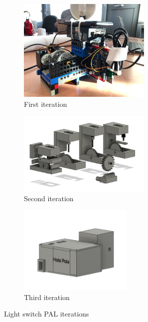 \documentclass[onecolumn]{IEEEtran}
\begin{document}
          \begin{figure}
            \begin{subfigure}{.3\textwidth}
                \centering
                \includegraphics[width=0.7\textwidth]{images/Light1.png}
                \caption{First iteration}
            \end{subfigure}\hfill
            \begin{subfigure}{.3\textwidth}
                \centering
                \includegraphics[width=0.7\textwidth]{images/Light2.png}
                \caption{Second iteration}
            \end{subfigure}\hfill
            \begin{subfigure}{.3\textwidth}
                \centering
                \includegraphics[width=0.6\textwidth]{images/Light3.png}
                \caption{Third iteration}
            \end{subfigure}
        \caption{Light switch PAL iterations}
        \label{fig:switchPALs}
        \end{figure}
         
\end{document}
